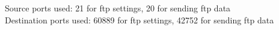 Source ports used: 21 for ftp settings, 20 for sending ftp data \\
Destination ports used: 60889 for ftp settings, 42752 for sending ftp data
